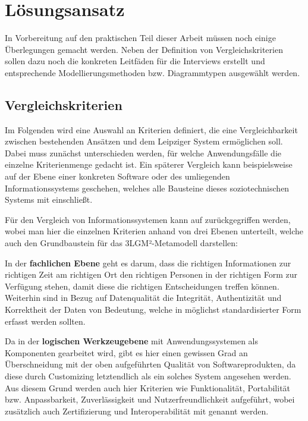 \chapter{Lösungsansatz}\label{ch:approach}

In Vorbereitung auf den praktischen Teil dieser Arbeit müssen noch einige Überlegungen gemacht werden. Neben der Definition von Vergleichskriterien sollen dazu noch die konkreten Leitfäden für die Interviews erstellt und entsprechende Modellierungsmethoden bzw. Diagrammtypen ausgewählt werden.

\section{Vergleichskriterien}

Im Folgenden wird eine Auswahl an Kriterien definiert, die eine Vergleichbarkeit zwischen bestehenden Ansätzen und dem Leipziger System ermöglichen soll. Dabei muss zunächst unterschieden werden, für welche Anwendungsfälle die einzelne Kriterienmenge gedacht ist. Ein späterer Vergleich kann beispielsweise auf der Ebene einer konkreten Software oder des umliegenden Informationssystems geschehen, welches alle Bausteine dieses soziotechnischen Systems mit einschließt.

Für den Vergleich von Informationssystemen kann auf \citet{Winter.2023} zurückgegriffen werden, wobei man hier die einzelnen Kriterien anhand von drei Ebenen unterteilt, welche auch den Grundbaustein für das 3LGM²-Metamodell darstellen:

In der \textbf{fachlichen Ebene} geht es darum, dass die richtigen Informationen zur richtigen Zeit am richtigen Ort den richtigen Personen in der richtigen Form zur Verfügung stehen, damit diese die richtigen Entscheidungen treffen können. Weiterhin sind in Bezug auf Datenqualität die Integrität, Authentizität und Korrektheit der Daten von Bedeutung, welche in möglichst standardisierter Form erfasst werden sollten.

Da in der \textbf{logischen Werkzeugebene} mit Anwendungssystemen als Komponenten gearbeitet wird, gibt es hier einen gewissen Grad an Überschneidung mit der oben aufgeführten Qualität von Softwareprodukten, da diese durch Customizing letztendlich als ein solches System angesehen werden. Aus diesem Grund werden auch hier Kriterien wie Funktionalität, Portabilität bzw. Anpassbarkeit, Zuverlässigkeit und Nutzerfreundlichkeit aufgeführt, wobei zusätzlich auch Zertifizierung und Interoperabilität mit genannt werden.

